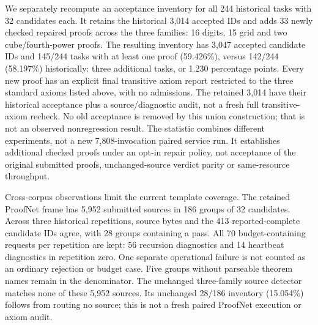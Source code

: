 \documentclass[10pt,twocolumn]{article}
\begin{document}
We separately recompute an acceptance inventory for all 244 historical
tasks with 32 candidates each. It retains the historical 3,014 accepted IDs
and adds 33 newly checked repaired proofs across the three families:
16 digits, 15 grid and two cube/fourth-power proofs. The resulting inventory
has 3,047 accepted candidate IDs and 145/244 tasks with at least one proof
(59.426\%), versus 142/244 (58.197\%) historically: three additional tasks,
or 1.230 percentage points. Every new proof has an explicit final transitive
axiom report restricted to the three standard axioms listed above, with no
admissions. The retained 3,014 have their historical acceptance plus a
source/diagnostic audit, not a fresh full transitive-axiom recheck.
No old acceptance is removed by this union construction; that is not an
observed nonregression result. The statistic combines different experiments,
not a new 7,808-invocation paired service run. It establishes additional
checked proofs under an opt-in repair policy, not acceptance of the original
submitted proofs, unchanged-source verdict parity or same-resource throughput.

Cross-corpus observations limit the current template coverage.
The retained ProofNet frame has 5,952 submitted sources in 186 groups of
32 candidates. Across three historical repetitions, source bytes and the
413 reported-complete candidate IDs agree, with 28 groups containing a pass.
All 70 budget-containing requests per repetition are kept: 56 recursion
diagnostics and 14 heartbeat diagnostics in repetition zero. One separate
operational failure is not counted as an ordinary rejection or budget case.
Five groups without parseable theorem names remain in the denominator.
The unchanged three-family source detector matches none of these 5,952
sources. Its unchanged 28/186 inventory (15.054\%) follows from routing no
source; this is not a fresh paired ProofNet execution or axiom audit.
\end{document}
